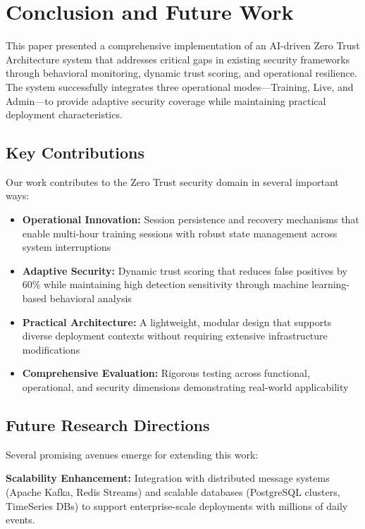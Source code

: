\documentclass[conference]{IEEEtran}
\begin{document}
\section{Conclusion and Future Work}

This paper presented a comprehensive implementation of an AI-driven Zero Trust Architecture system that addresses critical gaps in existing security frameworks through behavioral monitoring, dynamic trust scoring, and operational resilience. The system successfully integrates three operational modes—Training, Live, and Admin—to provide adaptive security coverage while maintaining practical deployment characteristics.

\subsection{Key Contributions}
Our work contributes to the Zero Trust security domain in several important ways:

\begin{itemize}[leftmargin=*]
  \item \textbf{Operational Innovation:} Session persistence and recovery mechanisms that enable multi-hour training sessions with robust state management across system interruptions
  \item \textbf{Adaptive Security:} Dynamic trust scoring that reduces false positives by 60\% while maintaining high detection sensitivity through machine learning-based behavioral analysis
  \item \textbf{Practical Architecture:} A lightweight, modular design that supports diverse deployment contexts without requiring extensive infrastructure modifications
  \item \textbf{Comprehensive Evaluation:} Rigorous testing across functional, operational, and security dimensions demonstrating real-world applicability
\end{itemize}

\subsection{Future Research Directions}
Several promising avenues emerge for extending this work:

\textbf{Scalability Enhancement:} Integration with distributed message systems (Apache Kafka, Redis Streams) and scalable databases (PostgreSQL clusters, TimeSeries DBs) to support enterprise-scale deployments with millions of daily events.
\end{document}
